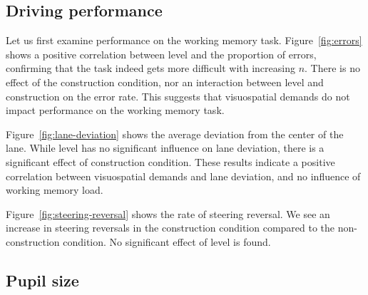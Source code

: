 \subsection{Driving performance}
Let us first examine performance on the working memory task.
Figure~\ref{fig:errors} shows a positive correlation between \nback level and the proportion of errors,
confirming that the \nback task indeed gets more difficult with increasing \(n\). 
There is no effect of the construction condition, nor an interaction between \nback level and construction on the error rate.
This suggests that visuospatial demands do not impact performance on the working memory task.

Figure~\ref{fig:lane-deviation} shows the average deviation from the center of the lane.
While \nback level has no significant influence on lane deviation, there is a significant effect of construction condition.
These results indicate a positive correlation between visuospatial demands and lane deviation, and no influence of working memory load.

Figure~\ref{fig:steering-reversal} shows the rate of steering reversal.
We see an increase in steering reversals in the construction condition compared to the non-construction condition.
No significant effect of \nback level is found.

\subsection{Pupil size}

